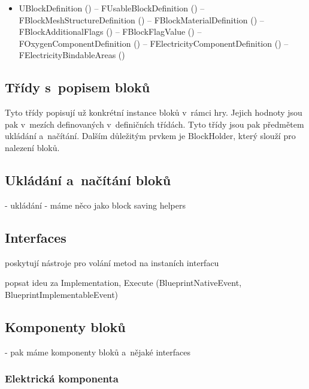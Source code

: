 \begin{itemize}
	\item UBlockDefinition ()
		\subitem -- FUsableBlockDefinition ()
		\subitem -- FBlockMeshStructureDefinition ()
			\subsubitem -- FBlockMaterialDefinition ()
		\subitem -- FBlockAdditionalFlags ()
			\subsubitem -- FBlockFlagValue ()	
		\subitem -- FOxygenComponentDefinition ()
		\subitem -- FElectricityComponentDefinition ()
			\subsubitem -- FElectricityBindableAreas ()	
				
		

\end{itemize}

\subsection{Třídy s~popisem bloků}
Tyto třídy popisují už konkrétní instance bloků v~rámci hry. Jejich hodnoty jsou pak v~mezích definovaných v~definičních třídách. Tyto třídy jsou pak předmětem ukládání a~načítání. Dalším důležitým prvkem je BlockHolder, který slouží pro nalezení bloků. 

\subsection{Ukládání a~načítání bloků}

- ukládání - máme něco jako block saving helpers


\subsection{Interfaces}
poskytují nástroje pro volání metod na instaních interfacu

popsat ideu za Implementation, Execute (BlueprintNativeEvent, BlueprintImplementableEvent)

\subsection{Komponenty bloků}
- pak máme komponenty bloků a~nějaké interfaces

\subsubsection{Elektrická komponenta}


